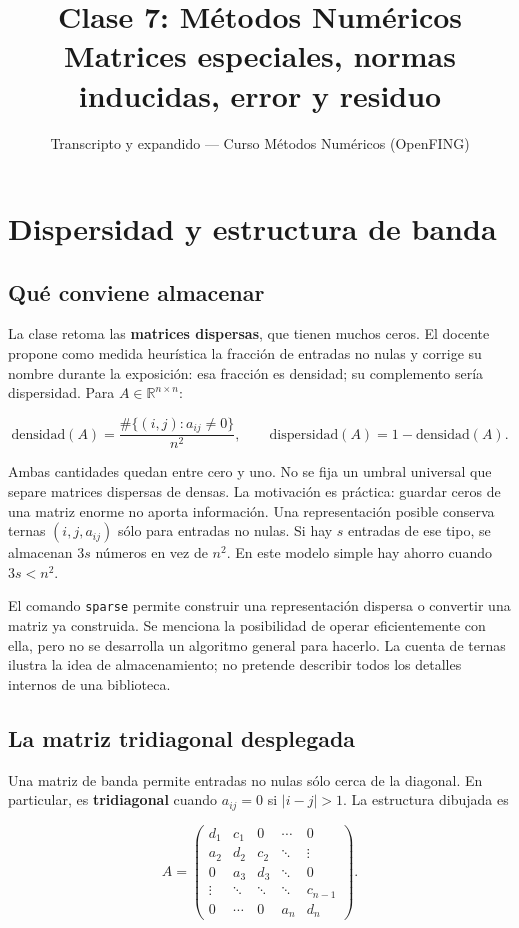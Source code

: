 \documentclass[12pt,a4paper]{article}
\title{\textbf{Clase 7: Métodos Numéricos} \\[0.3em]
        \large{Matrices especiales, normas inducidas, error y residuo}}
\author{Transcripto y expandido --- Curso Métodos Numéricos (OpenFING)}
\date{}
\begin{document}
\maketitle
\thispagestyle{empty}
\newpage
\tableofcontents
\newpage

\section{Dispersidad y estructura de banda}

\subsection{Qué conviene almacenar}

La clase retoma las \textbf{matrices dispersas}, que tienen muchos ceros. El docente propone como medida heurística la fracción de entradas no nulas y corrige su nombre durante la exposición: esa fracción es densidad; su complemento sería dispersidad. Para $A\in\mathbb R^{n\times n}$:

\[
\text{densidad}(A)=\frac{\#\{(i,j):a_{ij}\ne0\}}{n^2},\qquad
\text{dispersidad}(A)=1-\text{densidad}(A).
\]

Ambas cantidades quedan entre cero y uno. No se fija un umbral universal que separe matrices dispersas de densas. La motivación es práctica: guardar ceros de una matriz enorme no aporta información. Una representación posible conserva ternas $(i,j,a_{ij})$ sólo para entradas no nulas. Si hay $s$ entradas de ese tipo, se almacenan $3s$ números en vez de $n^2$. En este modelo simple hay ahorro cuando $3s<n^2$.

El comando \texttt{sparse} permite construir una representación dispersa o convertir una matriz ya construida. Se menciona la posibilidad de operar eficientemente con ella, pero no se desarrolla un algoritmo general para hacerlo. La cuenta de ternas ilustra la idea de almacenamiento; no pretende describir todos los detalles internos de una biblioteca.

\subsection{La matriz tridiagonal desplegada}

Una matriz de banda permite entradas no nulas sólo cerca de la diagonal. En particular, es \textbf{tridiagonal} cuando $a_{ij}=0$ si $|i-j|>1$. La estructura dibujada es

\[
A=\begin{pmatrix}
d_1&c_1&0&\cdots&0\\
a_2&d_2&c_2&\ddots&\vdots\\
0&a_3&d_3&\ddots&0\\
\vdots&\ddots&\ddots&\ddots&c_{n-1}\\
0&\cdots&0&a_n&d_n
\end{pmatrix}.
\]
\end{document}
